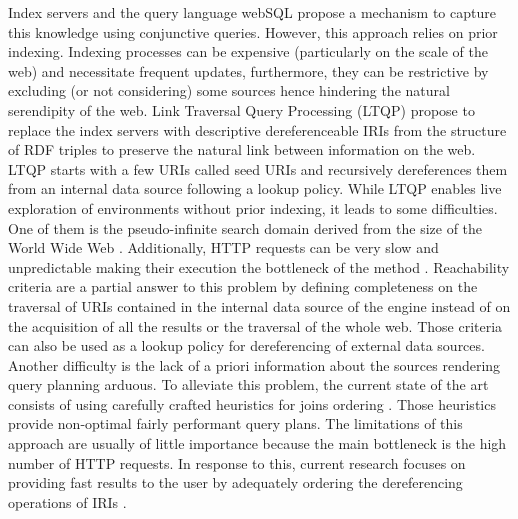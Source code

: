 Index servers and the query language webSQL \cite{Mendelzon1996} propose a mechanism to capture this knowledge using conjunctive queries.
However, this approach relies on prior indexing.
Indexing processes can be expensive (particularly on the scale of the web) and necessitate frequent updates, furthermore, they can be restrictive
by excluding (or not considering) some sources hence hindering the natural serendipity of the web.  
Link Traversal Query Processing (LTQP) \cite{Hartig2012} propose to replace the index servers with descriptive dereferenceable IRIs 
from the structure of RDF triples to preserve the natural link between information on the web.
LTQP starts with a few URIs called seed URIs and recursively dereferences them from an internal data source following a lookup policy.
While LTQP enables live exploration of environments without prior indexing, it leads to some difficulties.
One of them is the pseudo-infinite search domain derived from the size of the World Wide Web \cite{hartig2016walking}.
Additionally, HTTP requests can be very slow and unpredictable making their execution the bottleneck of the method \cite{hartig2016walking}.
Reachability criteria \cite{Hartig2012} are a partial answer to this problem by defining completeness on the traversal of URIs
contained in the internal data source of the engine instead of on the acquisition of all the results or the traversal of the whole web.
Those criteria can also be used as a lookup policy for dereferencing of external data sources.
Another difficulty is the lack of a priori information about the sources rendering query planning arduous.
To alleviate this problem, the current state of the art consists of using carefully crafted heuristics for joins ordering \cite{Hartig2011}.
Those heuristics provide non-optimal fairly performant query plans.
The limitations of this approach are usually of little importance because the main bottleneck is the high number of HTTP requests.
In response to this, current research focuses on providing fast results to the user by adequately ordering the dereferencing operations of IRIs \cite{hartig2016walking}.

